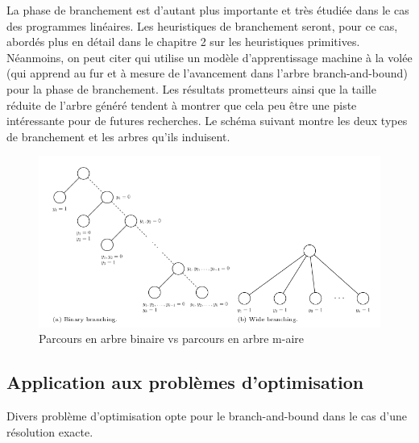 \documentclass[12pt,a4paper,oneside]{book}
\theoremstyle{definition}
\begin{document}
	La phase de branchement est d'autant plus importante et très étudiée dans le cas des programmes linéaires. Les heuristiques de branchement seront, pour ce cas, abordés plus en détail dans le chapitre 2 sur les heuristiques primitives. Néanmoins, on peut citer \cite{khalil2016learning} qui utilise un modèle d'apprentissage machine à la volée (qui apprend au fur et à mesure de l'avancement dans l'arbre branch-and-bound) pour la phase de branchement. Les résultats prometteurs ainsi que la taille réduite de l'arbre généré tendent à montrer que cela peu être une piste intéressante pour de futures recherches.
	Le schéma suivant montre les deux types de branchement et les arbres qu'ils induisent.
	\begin{figure}[H]
		\centering
		\includegraphics[width=0.9\linewidth]{binary_vs_wide.png}
		\caption{Parcours en arbre binaire vs parcours en arbre m-aire}
	\end{figure}
	
	
	
	
	\subsection{Application aux problèmes d'optimisation}
	Divers problème d'optimisation opte pour le branch-and-bound dans le cas d'une résolution exacte. 
	
\end{document}
